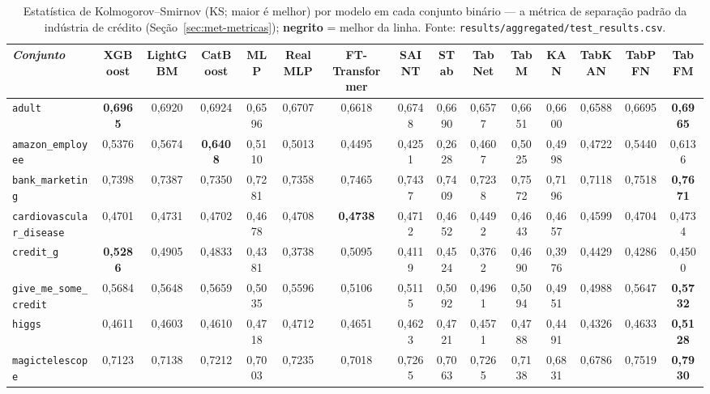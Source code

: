 \begin{landscape}

\begin{table}[htbp]
\centering
\footnotesize
\setlength{\tabcolsep}{3pt}
\caption[Estatística KS por conjunto --- binária]{Estatística de Kolmogorov--Smirnov (KS; maior é melhor) por modelo em cada conjunto binário --- a métrica de separação padrão da indústria de crédito (Seção~\ref{sec:met-metricas}); \textbf{negrito} = melhor da linha. Fonte: \texttt{results/\allowbreak aggregated/\allowbreak test\_\allowbreak results.\allowbreak csv}.}
\label{tab:app-ks}
\begin{tabular}{lcccccccccccccc}
\toprule
\emph{Conjunto} & XGBoost & LightGBM & CatBoost & MLP & RealMLP & FT-Transformer & SAINT & STab & TabNet & TabM & KAN & TabKAN & TabPFN & TabFM \\
\midrule
\texttt{adult} & \textbf{0{,}6965} & 0{,}6920 & 0{,}6924 & 0{,}6596 & 0{,}6707 & 0{,}6618 & 0{,}6748 & 0{,}6690 & 0{,}6577 & 0{,}6651 & 0{,}6600 & 0{,}6588 & 0{,}6695 & \textbf{0{,}6965} \\
\texttt{amazon\_\allowbreak employee} & 0{,}5376 & 0{,}5674 & \textbf{0{,}6408} & 0{,}5110 & 0{,}5013 & 0{,}4495 & 0{,}4251 & 0{,}2628 & 0{,}4607 & 0{,}5025 & 0{,}4998 & 0{,}4722 & 0{,}5440 & 0{,}6136 \\
\texttt{bank\_\allowbreak marketing} & 0{,}7398 & 0{,}7387 & 0{,}7350 & 0{,}7281 & 0{,}7358 & 0{,}7465 & 0{,}7437 & 0{,}7409 & 0{,}7238 & 0{,}7572 & 0{,}7196 & 0{,}7118 & 0{,}7518 & \textbf{0{,}7671} \\
\texttt{cardiovascular\_\allowbreak disease} & 0{,}4701 & 0{,}4731 & 0{,}4702 & 0{,}4678 & 0{,}4708 & \textbf{0{,}4738} & 0{,}4712 & 0{,}4652 & 0{,}4492 & 0{,}4643 & 0{,}4657 & 0{,}4599 & 0{,}4704 & 0{,}4734 \\
\texttt{credit\_g} & \textbf{0{,}5286} & 0{,}4905 & 0{,}4833 & 0{,}4381 & 0{,}3738 & 0{,}5095 & 0{,}4119 & 0{,}4524 & 0{,}3762 & 0{,}4690 & 0{,}3976 & 0{,}4429 & 0{,}4286 & 0{,}4500 \\
\texttt{give\_\allowbreak me\_\allowbreak some\_\allowbreak credit} & 0{,}5684 & 0{,}5648 & 0{,}5659 & 0{,}5035 & 0{,}5596 & 0{,}5106 & 0{,}5115 & 0{,}5092 & 0{,}4961 & 0{,}5094 & 0{,}4951 & 0{,}4988 & 0{,}5647 & \textbf{0{,}5732} \\
\texttt{higgs} & 0{,}4611 & 0{,}4603 & 0{,}4610 & 0{,}4718 & 0{,}4712 & 0{,}4651 & 0{,}4623 & 0{,}4721 & 0{,}4571 & 0{,}4788 & 0{,}4491 & 0{,}4326 & 0{,}4633 & \textbf{0{,}5128} \\
\texttt{magictelescope} & 0{,}7123 & 0{,}7138 & 0{,}7212 & 0{,}7003 & 0{,}7235 & 0{,}7018 & 0{,}7265 & 0{,}7063 & 0{,}7265 & 0{,}7138 & 0{,}6831 & 0{,}6786 & 0{,}7519 & \textbf{0{,}7930} \\

\end{tabular}
\end{table}
\end{landscape}
